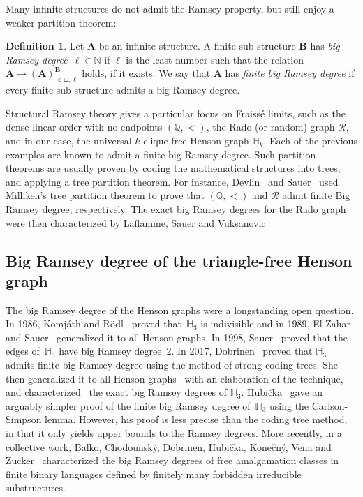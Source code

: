 \documentclass{article}
\def\QQ{\mathbb{Q}}
\def\HH{\mathbb{H}}
\newcommand{\NN}[0]{\mathbb{N}}
\numberwithin{theorem}{section}
\theoremstyle{definition}
\newtheorem{definition}[theorem]{Definition}
\begin{document}
Many infinite structures do not admit the Ramsey property, but still enjoy a weaker partition theorem:

\begin{definition}
Let $\mathbf A$ be an infinite structure.
A finite sub-structure $\mathbf B$ has \emph{big Ramsey degree}~$\ell \in \NN$ if $\ell$ is the least number such that   the relation $\mathbf A \to (\mathbf A)^{\mathbf B}_{<\omega, \ell}$ holds, if it exists. We say that $\mathbf A$ has \emph{finite big Ramsey degree} if every finite sub-structure admits a big Ramsey degree.
\end{definition}

Structural Ramsey theory gives a particular focus on Fraissé limits, such as the dense linear order with no endpoints $(\QQ, <)$, the Rado (or random) graph $\mathcal R$, and in our case, the universal $k$-clique-free Henson graph $\HH_k$.
Each of the previous examples are known to admit a finite big Ramsey degree.
Such partition theorems are usually proven by coding the mathematical structures into trees, and applying a tree partition theorem. For instance, Devlin~\cite{devlin1980some} and Sauer~\cite{sauer2006coloring} used Milliken's tree partition theorem to prove that $(\QQ, <)$ and $\mathcal R$ admit finite Big Ramsey degree, respectively. The exact big Ramsey degrees for the Rado graph were then characterized by Laflamme, Sauer and Vuksanovic~\cite{laflamme2006canonical} 

\subsection{Big Ramsey degree of the triangle-free Henson graph}

The big Ramsey degree of the Henson graphs were a longstanding open question.
In 1986, Komj\'{a}th and R\"{o}dl~\cite{komjath1986coloring} proved that~$\HH_3$ is indivisible
and in 1989, El-Zahar and Sauer~\cite{elzahar1989indivisibility} generalized it to all Henson graphs.
In 1998, Sauer~\cite{sauer1998edge} proved that the edges of~$\HH_3$ have big Ramsey degree~2.
In 2017, Dobrinen~\cite{dobrinen2020ramsey} proved that $\HH_3$ admits finite big Ramsey degree using the method of strong coding trees. She then generalized it to all Henson graphs~\cite{dobrinen2023ramsey} with an elaboration of the technique, and characterized~\cite{dobrinen2020ramseypart2,balko2024exact} the exact big Ramsey degrees of $\HH_3$.
Hubi\v{c}ka~\cite{hubivcka2020big} gave an arguably simpler proof of the finite big Ramsey degree of~$\HH_3$ using the Carlson-Simpson lemma. However, his proof is less precise than the coding tree method, in that it only yields upper bounds to the Ramsey degrees. More recently, in a collective work, Balko, Chodounsk\'y, Dobrinen, Hubi\v{c}ka, Kone\v{c}n\'y,  Vena and Zucker~\cite{balko2021exact} characterized the big Ramsey degrees of free amalgamation classes in finite binary
languages defined by finitely many forbidden irreducible substructures.
\end{document}
